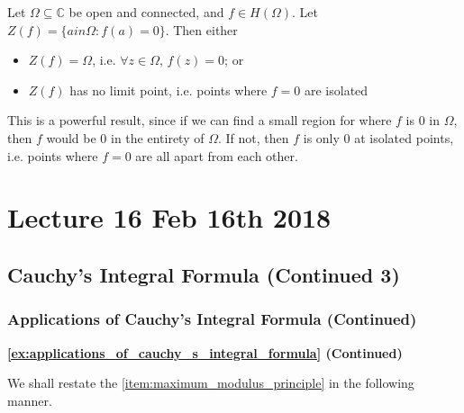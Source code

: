 \documentclass[11pt, oneside]{book}
\begin{document}
\begin{lemma}\label{lemma:zeros_everywhere_or_isolated_points}
	Let $\Omega \subseteq \mathbb{C}$ be open and connected, and $f \in H(\Omega)$. Let $Z(f) = \{a in \Omega : f(a) = 0 \}$. Then either
	\begin{itemize}
		\item $Z(f) = \Omega$, i.e. $\forall z \in \Omega, \, f(z) = 0$; or
		\item $Z(f)$ has no limit point, i.e. points where $f = 0$ are isolated
	\end{itemize}
\end{lemma}

This is a powerful result, since if we can find a small region for where $f$ is $0$ in $\Omega$, then $f$ would be $0$ in the entirety of $\Omega$. If not, then $f$ is only $0$ at isolated points, i.e. points where $f = 0$ are all apart from each other.




\chapter{Lecture 16 Feb 16th 2018}
	\label{chapter:lecture_16_feb_16th_2018}

\section{Cauchy's Integral Formula (Continued 3)} %
\label{sec:cauchy_s_integral_formula_continued_3}

\subsection{Applications of Cauchy's Integral Formula (Continued)} %
\label{sub:applications_of_cauchy_s_integral_formula_continued}

\textbf{\cref{ex:applications_of_cauchy_s_integral_formula} (Continued)}

We shall restate the \cref{item:maximum_modulus_principle} in the following manner.
\end{document}
